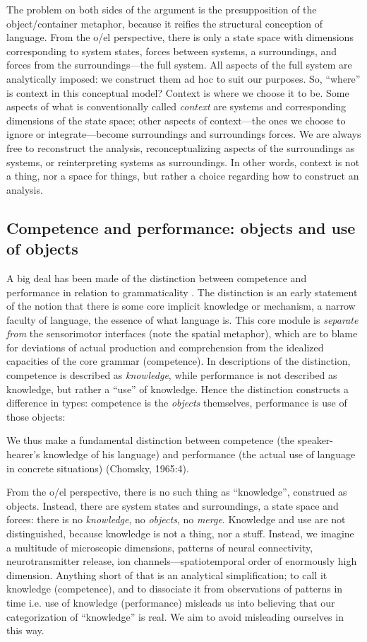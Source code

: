   The problem on both sides of the argument is the presupposition of the object/container metaphor, because it reifies the structural conception of language. From the o/el perspective, there is only a state space with dimensions corresponding to system states, forces between systems, a surroundings, and forces from the surroundings—the full system. All aspects of the full system are analytically imposed: we construct them ad hoc to suit our purposes. So, “where” is context in this conceptual model? Context is where we choose it to be. Some aspects of what is conventionally called \textit{context} are systems and corresponding dimensions of the state space; other aspects of context—the ones we choose to ignore or integrate—become surroundings and surroundings forces. We are always free to reconstruct the analysis, reconceptualizing aspects of the surroundings as systems, or reinterpreting systems as surroundings. In other words, context is not a thing, nor a space for things, but rather a choice regarding how to construct an analysis.

\subsection{Competence and performance: objects and use of objects}

A big deal has been made of the distinction between competence and performance in relation to grammaticality \citep{Chomsky1965}. The distinction is an early statement of the notion that there is some core implicit knowledge or mechanism, a narrow faculty of language, the essence of what language is. This core module is \textit{separate} \textit{from} the sensorimotor interfaces (note the spatial metaphor), which are to blame for deviations of actual production and comprehension from the idealized capacities of the core grammar (competence). In descriptions of the distinction, competence is described as \textit{knowledge}, while performance is not described as knowledge, but rather a “use” of knowledge. Hence the distinction constructs a difference in types: competence is the \textit{objects} themselves, performance is use of those objects:

We thus make a fundamental distinction between competence (the speaker-hearer's knowledge of his language) and performance (the actual use of language in concrete situations) (Chomsky, 1965:4).

  From the o/el perspective, there is no such thing as “knowledge”, construed as objects. Instead, there are system states and surroundings, a state space and forces: there is no \textit{knowledge}, no \textit{objects}, no \textit{merge}. Knowledge and use are not distinguished, because knowledge is not a thing, nor a stuff. Instead, we imagine a multitude of microscopic dimensions, patterns of neural connectivity, neurotransmitter release, ion channels—spatiotemporal order of enormously high dimension. Anything short of that is an analytical simplification; to call it knowledge (competence), and to dissociate it from observations of patterns in time i.e. use of knowledge (performance) misleads us into believing that our categorization of “knowledge” is real. We aim to avoid misleading ourselves in this way.

